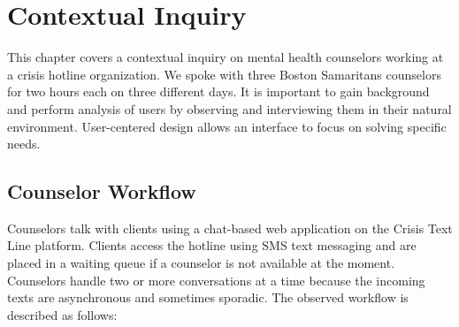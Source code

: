 \chapter{Contextual Inquiry}

This chapter covers a contextual inquiry \cite{contextual-design} on mental health counselors working at a crisis hotline organization. We spoke with three Boston Samaritans counselors for two hours each on three different days. It is important to gain background and perform analysis of users by observing and interviewing them in their natural environment. User-centered design allows an interface to focus on solving specific needs.

\section{Counselor Workflow}

Counselors talk with clients using a chat-based web application on the Crisis Text Line platform. Clients access the hotline using SMS text messaging and are placed in a waiting queue if a counselor is not available at the moment. Counselors handle two or more conversations at a time because the incoming texts are asynchronous and sometimes sporadic. The observed workflow is described as follows:

